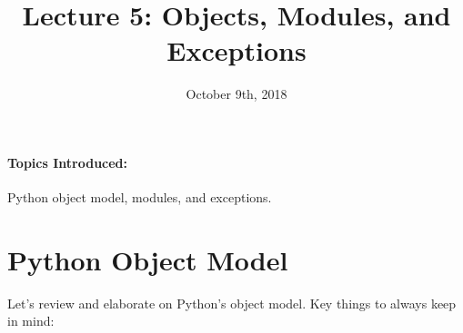 \documentclass[12pt,letterpaper,twoside]{article}
\begin{document}
\title{Lecture 5: Objects, Modules, and Exceptions\vspace{-5ex}}
\date{October 9th, 2018}
\maketitle

{\footnotesize
\paragraph{Topics Introduced:} Python object model, 
modules, and exceptions.
}
\vspace{-3ex}
\section{Python Object Model}
Let's review and elaborate on Python's object model. Key things to
always keep in mind:
\end{document}
